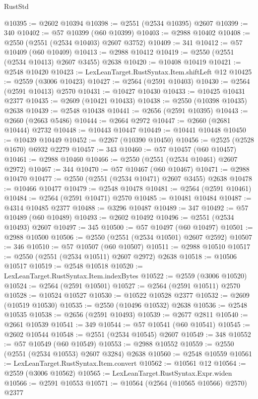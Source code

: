 \begin{lexlean}{RustStd}
\begin{coremodule}
@10395 := @2602 @10394
@10398 := @2551 (@2534 @10395) @2607
@10399 := 340
@10402 := @57 @10399 (@60 @10399)
@10403 := @2988 @10402
@10408 := @2550 (@2551 (@2534 @10403) @2607 @3752)
@10409 := 341
@10412 := @57 @10409 (@60 @10409)
@10413 := @2988 @10412
@10419 := @2550 (@2551 (@2534 @10413) @2607 @3455) @2638
@10420 := @10408 @10419
@10421 := @2548 @10420
@10423 := LexLeanTarget.RustSyntax.Item.shiftLeft @12
@10425 := @2559 (@3006 @10423)
@10427 := @2564 (@2591 @10403)
@10430 := @2564 (@2591 @10413) @2570
@10431 := @10427 @10430
@10433 := @10425 @10431 @2377
@10435 := @2609 (@10421 @10433)
@10438 := @2550 (@10398 @10435) @2638
@10439 := @2548 @10438
@10441 := @2656 (@2591 @10395)
@10443 := @2660 (@2663 @5486)
@10444 := @2664 @2972
@10447 := @2660 (@2681 @10444) @2732
@10448 := @10443 @10447
@10449 := @10441 @10448
@10450 := @10439 @10449
@10452 := @2267 (@10390 @10450)
@10456 := @2525 (@2528 @1670) @6932 @2279
@10457 := 343
@10460 := @57 @10457 (@60 @10457)
@10461 := @2988 @10460
@10466 := @2550 (@2551 (@2534 @10461) @2607 @2972)
@10467 := 344
@10470 := @57 @10467 (@60 @10467)
@10471 := @2988 @10470
@10477 := @2550 (@2551 (@2534 @10471) @2607 @3455) @2638
@10478 := @10466 @10477
@10479 := @2548 @10478
@10481 := @2564 (@2591 @10461)
@10484 := @2564 (@2591 @10471) @2570
@10485 := @10481 @10484
@10487 := @4314 @10485 @2377
@10488 := @3296 @10487
@10489 := 347
@10492 := @57 @10489 (@60 @10489)
@10493 := @2602 @10492
@10496 := @2551 (@2534 @10493) @2607
@10497 := 345
@10500 := @57 @10497 (@60 @10497)
@10501 := @2988 @10500
@10506 := @2550 (@2551 (@2534 @10501) @2607 @2592)
@10507 := 346
@10510 := @57 @10507 (@60 @10507)
@10511 := @2988 @10510
@10517 := @2550 (@2551 (@2534 @10511) @2607 @2972) @2638
@10518 := @10506 @10517
@10519 := @2548 @10518
@10520 := LexLeanTarget.RustSyntax.Item.indexBytes
@10522 := @2559 (@3006 @10520)
@10524 := @2564 (@2591 @10501)
@10527 := @2564 (@2591 @10511) @2570
@10528 := @10524 @10527
@10530 := @10522 @10528 @2377
@10532 := @2609 (@10519 @10530)
@10535 := @2550 (@10496 @10532) @2638
@10536 := @2548 @10535
@10538 := @2656 (@2591 @10493)
@10539 := @2677 @2811
@10540 := @2661 @10539
@10541 := 349
@10544 := @57 @10541 (@60 @10541)
@10545 := @2602 @10544
@10548 := @2551 (@2534 @10545) @2607
@10549 := 348
@10552 := @57 @10549 (@60 @10549)
@10553 := @2988 @10552
@10559 := @2550 (@2551 (@2534 @10553) @2607 @3284) @2638
@10560 := @2548 @10559
@10561 := LexLeanTarget.RustSyntax.Item.convert
@10562 := @10561 @12
@10564 := @2559 (@3006 @10562)
@10565 := LexLeanTarget.RustSyntax.Expr.widen
@10566 := @2591 @10553
@10571 := @10564 (@2564 (@10565 @10566) @2570) @2377

\end{coremodule}
\end{lexlean}
